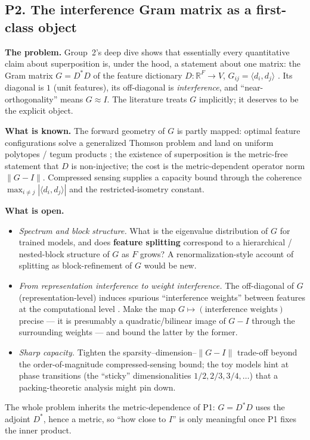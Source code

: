 \subsection*{P2. The interference Gram matrix as a first-class object}

\textbf{The problem.} Group~2's deep dive shows that essentially every quantitative claim about
superposition is, under the hood, a statement about one matrix: the Gram matrix $G=D^{*}D$ of the
feature dictionary $D:\mathbb{R}^{F}\to V$, $G_{ij}=\langle d_i,d_j\rangle$
\parencite{toy-models-superposition,toy-model-of-interference-weights}. Its diagonal is $1$
(unit features), its off-diagonal is \emph{interference}, and ``near-orthogonality'' means
$G\approx I$. The literature treats $G$ implicitly; it deserves to be the explicit object.

\textbf{What is known.} The forward geometry of $G$ is partly mapped: optimal feature
configurations solve a generalized Thomson problem and land on uniform polytopes / tegum products
\parencite{toy-models-superposition}; the existence of superposition is the metric-free statement
that $D$ is non-injective; the cost is the metric-dependent operator norm $\lVert G-I\rVert$.
Compressed sensing supplies a capacity bound through the coherence
$\max_{i\ne j}|\langle d_i,d_j\rangle|$ and the restricted-isometry constant.

\textbf{What is open.}
\begin{itemize}
\item \emph{Spectrum and block structure.} What is the eigenvalue distribution of $G$ for trained
  models, and does \textbf{feature splitting}
  \parencite{towards-monosemanticity,scaling-monosemanticity} correspond to a hierarchical /
  nested-block structure of $G$ as $F$ grows? A renormalization-style account of splitting as
  block-refinement of $G$ would be new.
\item \emph{From representation interference to weight interference.} The off-diagonal of $G$
  (representation-level) induces spurious ``interference weights'' between features at the
  computational level \parencite{toy-model-of-interference-weights}. Make the map
  $G\mapsto(\text{interference weights})$ precise --- it is presumably a quadratic/bilinear image
  of $G-I$ through the surrounding weights --- and bound the latter by the former.
\item \emph{Sharp capacity.} Tighten the sparsity--dimension--$\lVert G-I\rVert$ trade-off beyond
  the order-of-magnitude compressed-sensing bound; the toy models hint at phase transitions
  (the ``sticky'' dimensionalities $1/2,2/3,3/4,\dots$) that a packing-theoretic analysis might
  pin down.
\end{itemize}
The whole problem inherits the metric-dependence of P1: $G=D^{*}D$ uses the adjoint $D^{*}$, hence
a metric, so ``how close to $I$'' is only meaningful once P1 fixes the inner product.

